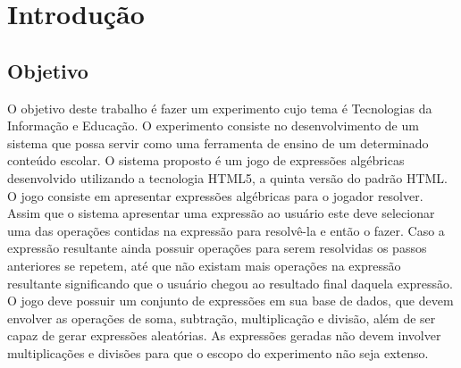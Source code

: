 \chapter*[Introdução]{Introdução}

\section{Objetivo}
O objetivo deste trabalho é fazer um experimento cujo tema é Tecnologias da Informação e Educação. O experimento consiste no desenvolvimento de um sistema que possa servir como uma ferramenta de ensino de um determinado conteúdo escolar. O sistema proposto é um jogo de expressões algébricas desenvolvido utilizando a tecnologia HTML5, a quinta versão do padrão HTML.
	O jogo consiste em apresentar expressões algébricas para o jogador resolver.
Assim que o sistema apresentar uma expressão ao usuário este deve selecionar uma das operações contidas na expressão para resolvê-la e então o fazer. Caso a expressão resultante ainda possuir operações para serem resolvidas os passos anteriores se repetem, até que não existam mais operações na expressão resultante significando que o usuário chegou ao resultado final daquela expressão.
	O jogo deve possuir um conjunto de expressões em sua base de dados, que devem envolver as operações de soma, subtração, multiplicação e divisão, além de ser capaz de gerar expressões aleatórias. As expressões geradas não devem involver multiplicações e divisões para que o escopo do experimento não seja extenso.

